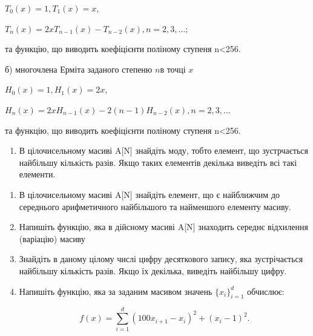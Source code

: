 \documentclass[]{article}
\makeatletter
\newcommand{\xslalph}[1]{\expandafter\@xslalph\csname c@#1\endcsname}
\newcommand{\@xslalph}[1]{%
    \ifcase#1\or а\or б\or в\or г\or д\or e\or є\or ж\or з\or i%
    \or й\or к\or л\or м\or н\or о\or п\or р\or с\or т%
    \or у\or ф\or х\or ц\or ч\or ш\or ю\or я\or аа\or бб\or вв%
    \else\@ctrerr\fi%
}
\makeatother
\begin{document}
\begin{enumerate}
\begin{enumerate}[label=\xslalph*)]
\begin{enumerate}
\begin{enumerate}[label=\xslalph*)]
\(T_{0}(x) = 1,T_{1}(x) = x,\)

\(T_{n}(x) = 2xT_{n - 1}(x) - T_{n - 2}(x),n = 2,3,\ldots;\)

та функцію, що виводить коефіцієнти поліному ступеня n\textless{}256.

б) многочлена Ерміта заданого степеню \(n\)в точці \(x\)

\(H_{0}(x) = 1,H_{1}(x) = 2x,\)

\(H_{n}(x) = 2xH_{n - 1}(x) - 2(n - 1)H_{n - 2}(x),n = 2,3,\ldots\)

та функцію, що виводить коефіцієнти поліному ступеня n\textless{}256.

\begin{enumerate}
\def\labelenumi{\arabic{enumi})}
\setcounter{enumi}{12}
\item
  В цілочисельному масиві A{[}N{]} знайдіть моду, тобто елемент, що
  зустрчається найбільшу кількість разів. Якщо таких елементів декілька
  виведіть всі такі елементи.
\end{enumerate}

\begin{enumerate}
\def\labelenumi{\arabic{enumi})}
\setcounter{enumi}{12}
\item
  В цілочисельному масиві A{[}N{]} знайдіть елемент, що є найближчим до
  середнього арифметичного найбільшого та найменшого елементу масиву.
\item
  Напишіть функцію, яка в дійсному масиві A{[}N{]} знаходить середнє
  відхилення (варіацію) масиву
\item
  Знайдіть в даному цілому числі цифру десяткового запису, яка
  зустрічається найбільшу кількість разів. Якщо їх декілька, виведіть
  найбільшу цифру.
\item
  Напишіть функцію, яка за заданим масивом значень
  \({\{ x_{i}\}}_{i = 1}^{d}\) обчислює:

  $$ f(x) = \sum\limits_{i=1}^{d} (100x_{i+1} -x_{i})^{2} + (x_{i}-1)^2. $$  


\end{enumerate}
\end{enumerate}
\end{enumerate}
\end{enumerate}
\end{enumerate}
\end{document}
